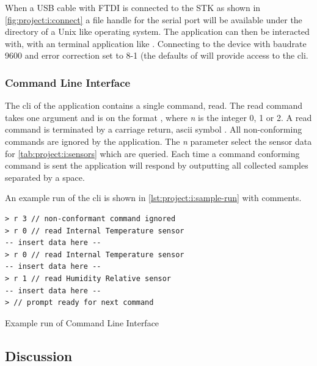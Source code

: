 When a USB cable with FTDI is connected to the STK as shown in \autoref{fig:project:i:connect} a file handle for the serial port will be available under the  directory of a Unix like operating system.
The application can then be interacted with, with an terminal application like .
Connecting to the device with baudrate 9600 and error correction set to 8-1 (the defaults of  will provide access to the {\tracker} \gls{cli}.

\subsubsection{Command Line Interface}
The \gls{cli} of the {\tracker} application contains a single command, read.
The read command takes one argument and is on the format , where \emph{n} is the integer 0, 1 or 2.
A read command is terminated by a carriage return, ascii symbol \code{\\n}.
All non-conforming commands are ignored by the application.
The \emph{n} parameter select the sensor data for \autoref{tab:project:i:sensors} which are queried.
Each time a command conforming command is sent the application will respond by outputting all collected samples separated by a space.

An example run of the \gls{cli} is shown in \autoref{lst:project:i:sample-run} with comments.

\begin{listing}[H]
  \begin{verbatim}
> r 3 // non-conformant command ignored
> r 0 // read Internal Temperature sensor
-- insert data here --
> r 0 // read Internal Temperature sensor
-- insert data here --
> r 1 // read Humidity Relative sensor
-- insert data here --
> // prompt ready for next command
  \end{verbatim}
  \caption{Example run of Command Line Interface}
  \label{lst:project:i:sample-run}
\end{listing}

\subsection{Discussion}
